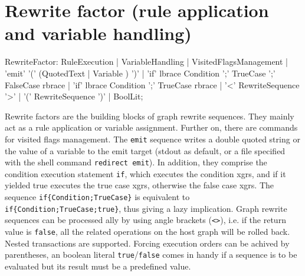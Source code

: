 \section{Rewrite factor (rule application and variable handling)}

\begin{rail} 
  RewriteFactor: 
    RuleExecution |
    VariableHandling |
	VisitedFlagsManagement |
	'emit' '(' (QuotedText | Variable ) ')' |
	'if' lbrace Condition ';' TrueCase ';' FalseCase rbrace |
	'if' lbrace Condition ';' TrueCase rbrace |
    '<' RewriteSequence '>' | 
    '(' RewriteSequence ')' |
    BoolLit;
\end{rail}\indexmain{\texttt{<>}}

Rewrite factors are the building blocks of graph rewrite sequences.
They mainly act as a rule application or variable assignment.
Further on, there are commands for visited flags management.
The \texttt{emit} sequence writes a double quoted string or the value of a variable to the emit target (stdout as default, or a file specified with the shell command \texttt{redirect emit}).
In addition, they comprise the condition execution statement \texttt{if}, which executes the condition xgrs, and if it yielded true executes the true case xgrs, otherwise the false case xgrs.
The sequence \verb#if{Condition;TrueCase}# is equivalent to \verb#if{Condition;TrueCase;true}#, thus giving a lazy implication.
Graph rewrite sequences can be processed ally by using angle brackets (\texttt{<>}), i.e.
if the return value is \texttt{false}, all the related operations on the host graph will be rolled back.
Nested transactions are supported.
Forcing execution orders can be achived by parentheses, an boolean literal \texttt{true}/\texttt{false} comes in handy if a sequence is to be evaluated but its result must be a predefined value.

